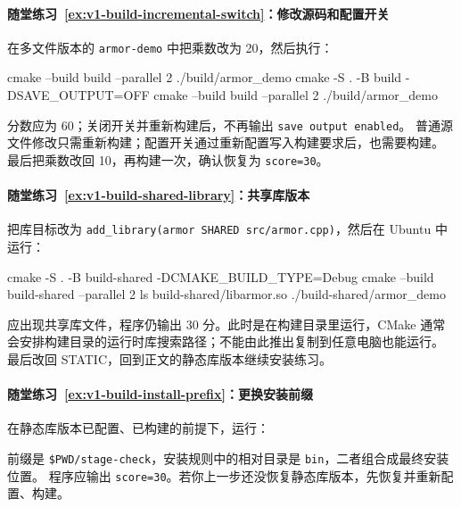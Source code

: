 \paragraph*{随堂练习~\ref{ex:v1-build-incremental-switch}：修改源码和配置开关}
\begin{solution}
在多文件版本的 \texttt{armor-demo} 中把乘数改为 20，然后执行：
\begin{tbash}
cmake --build build --parallel 2
./build/armor_demo
cmake -S . -B build -DSAVE_OUTPUT=OFF
cmake --build build --parallel 2
./build/armor_demo
\end{tbash}
分数应为 60；关闭开关并重新构建后，不再输出 \texttt{save output enabled}。
普通源文件修改只需重新构建；配置开关通过重新配置写入构建要求后，也需要构建。
最后把乘数改回 10，再构建一次，确认恢复为 \texttt{score=30}。
\end{solution}

\paragraph*{随堂练习~\ref{ex:v1-build-shared-library}：共享库版本}
\begin{solution}
把库目标改为 \texttt{add\_library(armor SHARED src/armor.cpp)}，然后在 Ubuntu 中运行：
\begin{tbash}
cmake -S . -B build-shared -DCMAKE_BUILD_TYPE=Debug
cmake --build build-shared --parallel 2
ls build-shared/libarmor.so
./build-shared/armor_demo
\end{tbash}
应出现共享库文件，程序仍输出 30 分。此时是在构建目录里运行，CMake 通常会安排构建目录的运行时库搜索路径；不能由此推出复制到任意电脑也能运行。
最后改回 STATIC，回到正文的静态库版本继续安装练习。
\end{solution}

\paragraph*{随堂练习~\ref{ex:v1-build-install-prefix}：更换安装前缀}
\begin{solution}
在静态库版本已配置、已构建的前提下，运行：
前缀是 \texttt{\$PWD/stage-check}，安装规则中的相对目录是 \texttt{bin}，二者组合成最终安装位置。
程序应输出 \texttt{score=30}。若你上一步还没恢复静态库版本，先恢复并重新配置、构建。
\end{solution}

